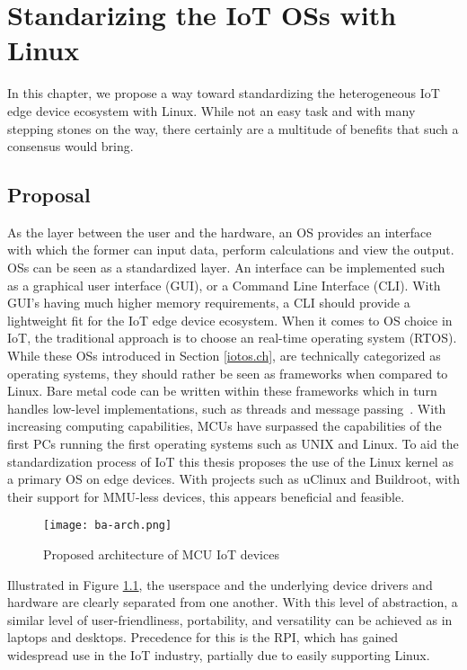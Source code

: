 \chapter{Standarizing the IoT OSs with Linux}

In this chapter, we propose a way toward standardizing the heterogeneous IoT edge device ecosystem with Linux. While not an easy task and with many stepping stones on the way, there certainly are a multitude of benefits that such a consensus would bring.

\section{Proposal}\label{proposal.ch}
As the layer between the user and the hardware, an OS provides an interface with which the former can input data, perform calculations and view the output. OSs can be seen as a standardized layer. An interface can be implemented such as a graphical user interface (GUI), or a Command Line Interface (CLI). With GUI's having much higher memory requirements, a CLI should provide a lightweight fit for the IoT edge device ecosystem. When it comes to OS choice in IoT, the traditional approach is to choose an real-time operating system (RTOS). While these OSs introduced in Section \ref{iotos.ch}, are technically categorized as operating systems, they should rather be seen as frameworks when compared to Linux. Bare metal code can be written within these frameworks which in turn handles low-level implementations, such as threads and message passing~\cite{jaycarlson}. With increasing computing capabilities, MCUs have surpassed the capabilities of the first PCs running the first operating systems such as UNIX and Linux. To aid the standardization process of IoT this thesis proposes the use of the Linux kernel as a primary OS on edge devices. With projects such as uClinux and Buildroot, with their support for MMU-less devices, this appears beneficial and feasible.

\begin{figure}[H]
\centering
\texttt{[image: ba-arch.png]}
\caption{Proposed architecture of MCU IoT devices}
\label{fig:ba-arch}
\end{figure}

Illustrated in Figure \ref{fig:ba-arch}, the userspace and the underlying device drivers and hardware are clearly separated from one another. With this level of abstraction, a similar level of user-friendliness, portability, and versatility can be achieved as in laptops and desktops. Precedence for this is the RPI, which has gained widespread use in the IoT industry, partially due to easily supporting Linux.

